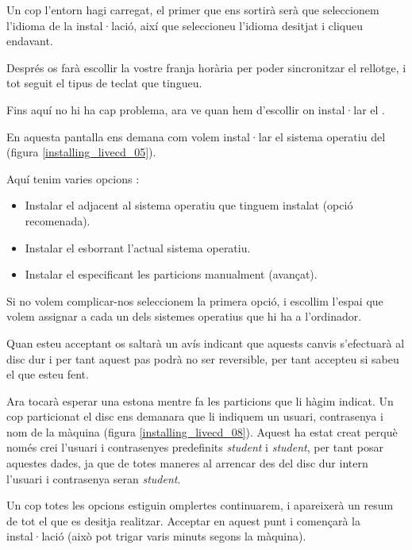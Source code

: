 
Un cop l'entorn hagi carregat, el primer que ens sortirà serà que seleccionem l'idioma de la instal·lació, així que seleccioneu l'idioma desitjat i cliqueu endavant.

Després os farà escollir la vostre franja horària per poder sincronitzar el rellotge, i tot seguit el tipus de teclat que tingueu.

Fins aquí no hi ha cap problema, ara ve quan hem d'escollir on instal·lar el \LiveCD. 

En aquesta pantalla ens demana com volem instal·lar el sistema operatiu del \LiveCD (figura \ref{installing_livecd_05}).

Aquí tenim varies opcions :

\begin{itemize}
	\item Instalar el \LiveCD adjacent al sistema operatiu que tinguem instalat (opció recomenada).
	\item Instalar el \LiveCD esborrant l'actual sistema operatiu.
	\item Instalar el \LiveCD especificant les particions manualment (avançat).
\end{itemize}

Si no volem complicar-nos seleccionem la primera opció, i escollim l'espai que volem assignar a cada un dels sistemes operatius que hi ha a l'ordinador.


Quan esteu acceptant os saltarà un avís indicant que aquests canvis s'efectuarà al disc dur i per tant aquest pas podrà no ser reversible, per tant accepteu si sabeu el que esteu fent.

Ara tocarà esperar una estona mentre fa les particions que li hàgim indicat. Un cop particionat el disc ens demanara que li indiquem un usuari, contrasenya i nom de la màquina (figura \ref{installing_livecd_08}). Aquest \LiveCD ha estat creat perquè només crei l'usuari i contrasenyes predefinits \emph{student} i \emph{student}, per tant posar aquestes dades, ja que de totes maneres al arrencar des del disc dur intern l'usuari i contrasenya seran \emph{student}.


Un cop totes les opcions estiguin omplertes continuarem, i apareixerà un resum de tot el que es desitja realitzar. Acceptar en aquest punt i començarà la instal·lació (això pot trigar varis minuts segons la màquina).

